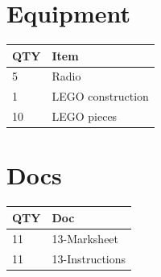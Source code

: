 \documentclass[10pt, A5]{article}
\begin{document}
\begin{framed}
\begin{minipage}{\textwidth}
        \begin{multicols}{2}

		\section*{\faWrench \: Equipment}

		
	\begin{center}
			\begin{tabular}{p{2cm}p{4cm}}


				\textbf{QTY} & \textbf{Item} \\\toprule
												5&Radio\\\midrule
												1&LEGO construction\\\midrule
												10&LEGO pieces\\\midrule
								\end{tabular}

			\end{center}

		
		\vfill\null
		\columnbreak

			\section*{\faFile \: Docs}
		 	\begin{center}
			\begin{tabular}{p{2cm}p{4cm}}

			\textbf{QTY} & \textbf{Doc} \\\toprule
										11&13-Marksheet\\\midrule
										11&13-Instructions\\\midrule
							\end{tabular}
			\end{center}
	

		\vfill\null

		\end{multicols}
\end{minipage}
\end{framed}
\end{document}
